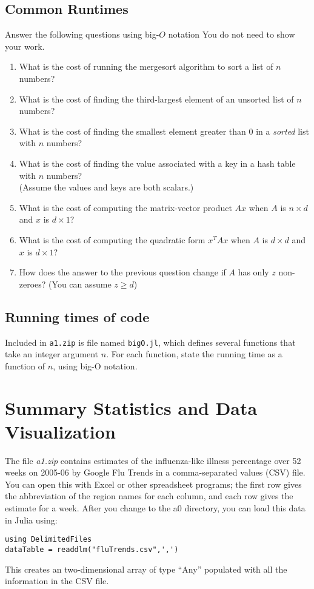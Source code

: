\documentclass{article}
\def\blu#1{{\color{blu}#1}}
\begin{document}
\subsection{Common Runtimes}

\blu{Answer the following questions using big-$O$ notation} You do not need to show your work.
\begin{enumerate}
\item What is the cost of running the mergesort algorithm to sort  a list of $n$ numbers?
\item What is the cost of finding the third-largest element of an unsorted list of $n$ numbers?
\item What is the cost of finding the smallest element greater than 0 in a \emph{sorted} list with $n$ numbers?
\item What is the cost of finding the value associated with a key in a hash table with $n$ numbers? \\(Assume the values and keys are both scalars.)
\item What is the cost of computing the matrix-vector product $Ax$ when $A$ is $n \times d$ and $x$ is $d \times 1$?
\item What is the cost of computing the quadratic form $x^TAx$ when $A$ is $d \times d$ and $x$ is $d \times 1$?
\item How does the answer to the previous question change if $A$ has only $z$ non-zeroes? (You can assume $z \geq d$)
\end{enumerate}

\subsection{Running times of code}

Included in \texttt{a1.zip} is file named \texttt{bigO.jl}, which defines several functions
that take an integer argument $n$. For each function, \blu{state the running time as a function of $n$, using big-O notation}.


\section{Summary Statistics and Data Visualization}

The file \emph{a1.zip} contains estimates of the influenza-like illness percentage over 52 weeks on 2005-06 by Google Flu Trends in a comma-separated values (CSV) file. You can open this with Excel or other spreadsheet programs; the first row gives the abbreviation of the region names for each column, and each row gives the estimate for a week.
After you change to the a0 directory, you can load this data in Julia using:
\begin{verbatim}
using DelimitedFiles
dataTable = readdlm("fluTrends.csv",',')
\end{verbatim}
This creates an two-dimensional array of type ``Any''  populated with all the information in the CSV file.
\end{document}

